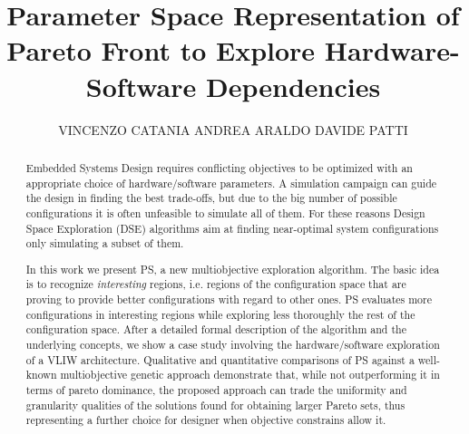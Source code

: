 \documentclass[prodmode,acmtecs]{acmsmall}
\begin{document}


\title{Parameter Space Representation of Pareto Front to
Explore Hardware-Software Dependencies}
\author{VINCENZO CATANIA
ANDREA ARALDO
DAVIDE PATTI
}

\begin{abstract}


Embedded Systems Design requires conflicting objectives to be
optimized with an appropriate choice of hardware/software parameters.
A simulation campaign can guide the design in finding the best
trade-offs, but due to the big number of possible configurations it
is often unfeasible to simulate all of them. For these reasons Design Space
Exploration (DSE) algorithms aim at finding near-optimal system
configurations only simulating a subset of them.

In this work we present PS, a new multiobjective exploration
algorithm. The basic idea is to recognize \emph{interesting} regions, i.e.
regions of the configuration space that are proving to provide better
configurations with regard to other ones. PS evaluates more configurations in
interesting regions while exploring less thoroughly the rest of the
configuration space. After a detailed formal description of the
algorithm and the underlying concepts, we show a 
case study involving the hardware/software exploration of a VLIW
architecture. Qualitative and quantitative comparisons of PS
against a well-known multiobjective genetic approach demonstrate that,
while not outperforming it in terms of pareto dominance, the proposed
approach can trade the uniformity and granularity qualities of the
solutions found for obtaining larger Pareto sets, thus representing a
further choice for designer when objective constrains allow it.
\end{abstract}
\end{document}

